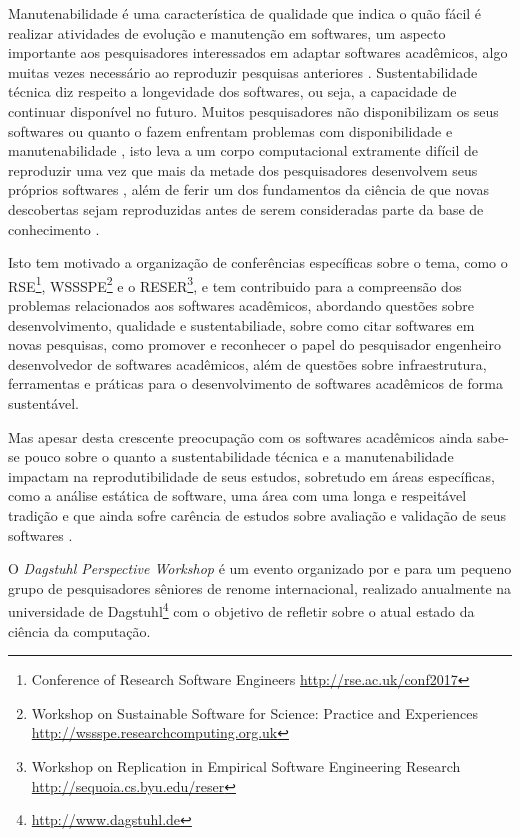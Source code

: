 Manutenabilidade é uma característica de qualidade que indica o quão fácil é
realizar atividades de evolução e manutenção em softwares, um aspecto
importante aos pesquisadores interessados em adaptar softwares acadêmicos, algo
muitas vezes necessário ao reproduzir pesquisas anteriores \cite{Peng2011}.
Sustentabilidade técnica diz respeito a longevidade dos softwares, ou seja, a
capacidade de continuar disponível no futuro. Muitos pesquisadores não
disponibilizam os seus softwares \cite{robles2010replicating,
amann2015software} ou quanto o fazem enfrentam problemas com disponibilidade e
manutenabilidade \cite{Prlic2012}, isto leva a um corpo computacional
extramente difícil de reproduzir uma vez que mais da metade dos pesquisadores
desenvolvem seus próprios softwares \cite{hettrick_2014_14809}, além de ferir um dos
fundamentos da ciência de que novas descobertas sejam reproduzidas antes de
serem consideradas parte da base de conhecimento \cite{Stodden2009}.

Isto tem motivado a organização de conferências específicas sobre o tema, como
o RSE\footnote{Conference of Research Software Engineers
\url{http://rse.ac.uk/conf2017}}, WSSSPE\footnote{Workshop on Sustainable
Software for Science: Practice and Experiences
\url{http://wssspe.researchcomputing.org.uk}} e o RESER\footnote{Workshop on
Replication in Empirical Software Engineering Research
\url{http://sequoia.cs.byu.edu/reser}}, e tem contribuido para a compreensão
dos problemas relacionados aos softwares acadêmicos, abordando questões sobre
desenvolvimento, qualidade e sustentabiliade, sobre como citar softwares em
novas pesquisas, como promover e reconhecer o papel do pesquisador engenheiro
desenvolvedor de softwares acadêmicos, além de questões sobre infraestrutura,
ferramentas e práticas para o desenvolvimento de softwares acadêmicos de
forma sustentável.

Mas apesar desta crescente preocupação com os softwares acadêmicos ainda
sabe-se pouco sobre o quanto a sustentabilidade técnica e a manutenabilidade
impactam na reprodutibilidade de seus estudos, sobretudo em áreas específicas,
como a análise estática de software, uma área com uma longa e respeitável
tradição e que ainda sofre carência de estudos sobre avaliação e validação de
seus softwares \cite{Li2010, ilyas2016static}.



O {\it Dagstuhl Perspective Workshop} é um evento organizado por e para um
pequeno grupo de pesquisadores sêniores de renome internacional, realizado
anualmente na universidade de Dagstuhl\footnote{\url{http://www.dagstuhl.de}}
com o objetivo de refletir sobre o atual estado da ciência da computação.

